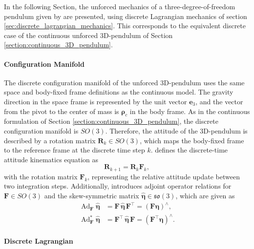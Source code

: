 In the following Section, the unforced mechanics of a three-degree-of-freedom pendulum given by \cite{Lee2008} are presented, using discrete Lagrangian mechanics of section \ref{sec:discrete_lagrangian_mechanics}. This corresponds to the equivalent discrete case of the continuous unforced 3D-pendulum of Section \ref{section:continuous_3D_pendulum}.

\paragraph{Configuration Manifold}

The discrete configuration manifold of the unforced 3D-pendulum uses the same space and body-fixed frame definitions as the continuous model. The gravity direction in the space frame is represented by the unit vector $\bm{e}_3$, and the vector from the pivot to the center of mass is $\bm{\rho}_c$ in the body frame. As in the continuous formulation of Section \ref{section:continuous_3D_pendulum}, the discrete configuration manifold is $SO(3)$. Therefore, the attitude of the 3D-pendulum is described by a rotation matrix $\bm{R}_k \in SO(3)$, which maps the body-fixed frame to the reference frame at the discrete time step $k$. \cite{Lee2008} defines the discrete-time attitude kinematics equation as
\begin{equation}\label{eq:discrete_attitude_kinematics_equation_SO3}
    \bm{R}_{k+1}= \bm{R}_k \bm{F}_k,
\end{equation}
with the rotation matrix $\bm{F}_k$, representing the relative attitude update between two integration steps. Additionally, \cite{Lee2008} introduces adjoint operator relations for $\bm{F} \in SO(3)$ and the skew-symmetric matrix $\hat{\bm{\eta}} \in \mathfrak{so}(3)$, which are given as
\begin{align}
\operatorname{Ad}_{\bm{F}} \hat{\bm{\eta}}
&=
\bm{F}\,\hat{\bm{\eta}}\,\bm{F}^{\top}
=
(\bm{F}\bm{\eta})^\wedge,
\\
\operatorname{Ad}^{*}_{\bm{F}} \hat{\bm{\eta}}
&=
\bm{F}^{\top}\,\hat{\bm{\eta}}\,\bm{F}
=
(\bm{F}^{\top}\bm{\eta})^\wedge.\label{eq:discrete_coadjoint}
\end{align}

\paragraph{Discrete Lagrangian}

